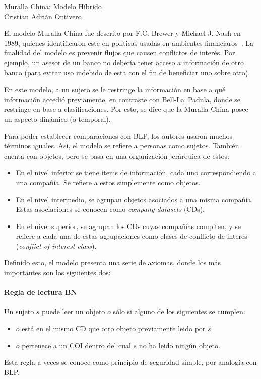 \documentclass[spanish]{article}
\begin{document}
\begin{center}
  {\LARGE Muralla China: Modelo Híbrido}\\[.2cm]
  Cristian Adrián Ontivero \\[.05cm]%
\end{center}

\vspace{0.2 cm}

El modelo Muralla China fue descrito por F.C. Brewer y Michael J. Nash en 1989,
quienes identificaron este en políticas usadas en ambientes financiaros~\cite{bn89}.
La finalidad del modelo es prevenir flujos que causen conflictos de interés. Por
ejemplo, un asesor de un banco no debería tener acceso a información de
otro banco (para evitar uso indebido de esta con el fin de beneficiar uno sobre
otro).


En este modelo, a un sujeto se le restringe la información en base a qué
información accedió previamente, en contraste con Bell-La~Padula, donde se
restringe en base a clasificaciones. Por esto, se dice que la Muralla China
posee un aspecto dinámico (o temporal).

Para poder establecer comparaciones con BLP, los autores usaron muchos
términos iguales. Así, el modelo se refiere a personas como sujetos. También
cuenta con objetos, pero se basa en una organización jerárquica de estos:
\begin{itemize}
  \itemsep 0cm
      \item En el nivel inferior se tiene ítems de información, cada uno
        correspondiendo a una compañía. Se refiere a estos simplemente como
        objetos.
      \item En el nivel intermedio, se agrupan objetos asociados a una misma
        compañía. Estas asociaciones se conocen como \textit{company datasets}
        (CDs).
      \item En el nivel superior, se agrupan los CDs cuyas compañías compiten, y
        se refiere a cada una de estas agrupaciones como clases de conflicto de
        interés (\textit{conflict of interest class}).
\end{itemize}
Definido esto, el modelo presenta una serie de axiomas, donde los más
importantes son los siguientes dos:
\paragraph{Regla de lectura BN} Un sujeto $s$ puede leer un objeto $o$ sólo si alguno de
los siguientes se cumplen:
\begin{itemize}
  \itemsep 0cm
  \item $o$ está en el mismo CD que otro objeto previamente leido por $s$.
  \item $o$ pertenece a un COI dentro del cual $s$ no ha leido ningún objeto.
\end{itemize}
Esta regla a veces se conoce como principio de seguridad simple, por analogía
con BLP.\@
\end{document}
